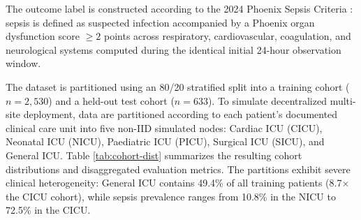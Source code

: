 \documentclass[runningheads]{llncs}
\begin{document}
The outcome label is constructed according to the 2024 Phoenix Sepsis Criteria \cite{schlapbach2024phoenix,sanchezpinto2024phoenix}: sepsis is defined as suspected infection accompanied by a Phoenix organ dysfunction score $\ge 2$ points across respiratory, cardiovascular, coagulation, and neurological systems computed during the identical initial 24-hour observation window.

The dataset is partitioned using an 80/20 stratified split into a training cohort ($n = 2{,}530$) and a held-out test cohort ($n = 633$). To simulate decentralized multi-site deployment, data are partitioned according to each patient's documented clinical care unit into five non-IID simulated nodes: Cardiac ICU (CICU), Neonatal ICU (NICU), Paediatric ICU (PICU), Surgical ICU (SICU), and General ICU. Table \ref{tab:cohort-dist} summarizes the resulting cohort distributions and disaggregated evaluation metrics. The partitions exhibit severe clinical heterogeneity: General ICU contains 49.4\% of all training patients (8.7$\times$ the CICU cohort), while sepsis prevalence ranges from 10.8\% in the NICU to 72.5\% in the CICU.
\end{document}
